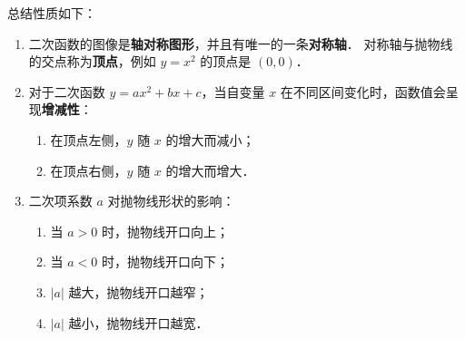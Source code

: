 \begin{conclusion}
总结性质如下：
\begin{enumerate}
    \item 二次函数的图像是\textbf{轴对称图形}，并且有唯一的一条\textbf{对称轴}．  
          对称轴与抛物线的交点称为\textbf{顶点}，例如 \(y = x^2\) 的顶点是 \((0, 0)\)．
    \item 对于二次函数 \(y = ax^2 + bx + c\)，当自变量 \(x\) 在不同区间变化时，函数值会呈现\textbf{增减性}： 
    \begin{enumerate}
              \item 在顶点左侧，\(y\) 随 \(x\) 的增大而减小；  
              \item 在顶点右侧，\(y\) 随 \(x\) 的增大而增大．
          \end{enumerate}
    \item 二次项系数 \(a\) 对抛物线形状的影响：  
          \begin{enumerate}
              \item 当 \(a > 0\) 时，抛物线开口向上；  
              \item 当 \(a < 0\) 时，抛物线开口向下；  
              \item \(|a|\) 越大，抛物线开口越窄；  
              \item \(|a|\) 越小，抛物线开口越宽．
          \end{enumerate}
\end{enumerate}
\end{conclusion}




